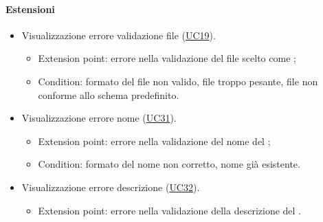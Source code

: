\paragraph*{Estensioni}
\begin{itemize}
  \item Visualizzazione errore validazione file (\hyperref[UC19]{UC19}).
  \begin{itemize}
    \item Extension point: errore nella validazione del file scelto come ;
    \item Condition: formato del file non valido, file troppo pesante, file non conforme allo schema predefinito.
  \end{itemize}
  \item Visualizzazione errore nome  (\hyperref[UC31]{UC31}).
  \begin{itemize}
    \item Extension point: errore nella validazione del nome del ;
    \item Condition: formato del nome non corretto, nome già esistente.
  \end{itemize}
  \item Visualizzazione errore descrizione  (\hyperref[UC32]{UC32}).
  \begin{itemize}
    \item Extension point: errore nella validazione della descrizione del .
  \end{itemize}
\end{itemize}
